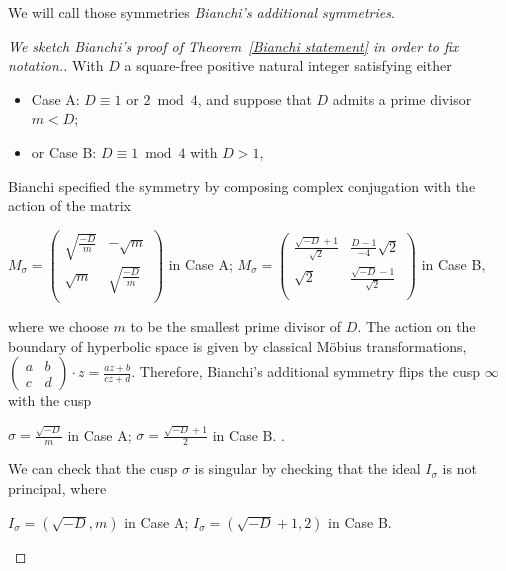 \documentclass[twoside,a4paper,12 pt]{amsart}
\theoremstyle{plain}
\theoremstyle{definition}
\theoremstyle{remark}
\begin{document}
We will call those symmetries \textit{Bianchi's additional symmetries}. 

\begin{proof}[We sketch Bianchi's proof of Theorem~\ref{Bianchi statement} in order to fix notation.]
With $D$ a square-free positive natural integer satisfying either
\begin{itemize}
 \item Case A: $D \equiv 1$ or $2 \bmod 4$, 
	and suppose that $D$ admits a prime divisor $m < D$; 
 \item or Case B:  $D \equiv 1 \bmod 4$ with $D > 1$,
\end{itemize}
Bianchi specified the symmetry by composing complex conjugation with the action of the matrix 
\begin{center}
\hfill
 $M_\sigma = $\scriptsize $ \begin{pmatrix}
    \sqrt{\frac{-D}{m}} & -\sqrt{m} \\
    \sqrt{m} & \sqrt{\frac{-D}{m}}  \\
   \end{pmatrix}$\normalsize
   in Case A;
   \hfill
   $M_\sigma = $\scriptsize $  \begin{pmatrix}
    \frac{\sqrt{-D}+1}{\sqrt{2}} & \frac{D-1}{-4}\sqrt{2} \\
    \sqrt{2} & \frac{\sqrt{-D}-1}{\sqrt{2}}  \\
   \end{pmatrix}$\normalsize
   in Case B,
   \hfill
   ${}$
\end{center}
where we choose $m$ to be the smallest prime divisor of $D$.
The action on the boundary of hyperbolic space is given by classical M\"obius transformations,
\scriptsize
$ \begin{pmatrix}
    a & b \\ c & d
   \end{pmatrix} 
   \cdot z = \frac{az+b}{cz+d}.$ \normalsize \medspace
Therefore, Bianchi's additional symmetry flips the cusp $\infty$ with the cusp 
\begin{center}
\hfill
 $\sigma = \frac{\sqrt{-D}}{m}$ in Case A;
 \hfill
  $\sigma = \frac{\sqrt{-D}+1}{2}$ in Case B.
 \hfill
 ${}$.
\end{center}
We can check that the cusp $\sigma$ is singular by checking that the ideal $I_\sigma$ is not principal, where
\begin{center}
\hfill
 $I_\sigma = ({\sqrt{-D}},{m})$ in Case A;
 \hfill
  $I_\sigma = ({\sqrt{-D}+1}, {2})$ in Case B.
 \hfill
 ${}$
\end{center}

\end{proof}
\end{document}
